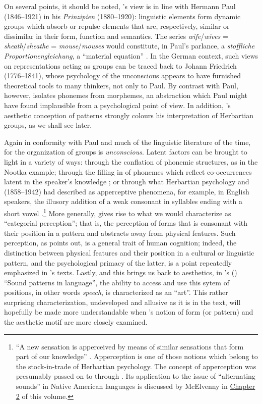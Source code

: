\documentclass[output=paper]{langscibook}
\begin{document}
On several points, it should be noted, {\Sapir}'s view is in line with Hermann Paul (1846--1921) in his \emph{Prinzipien} (1880--1920): linguistic elements form dynamic groups which absorb or repulse elements that are, respectively, similar or dissimilar in their form, function and semantics. The series \emph{wife}/\emph{wives} = \emph{sheath}/\emph{sheathe} = \emph{mouse}/\emph{mouses} would constitute, in Paul's parlance, a \emph{stoffliche Proportionengleichung}, a ``material equation'' \citep[86]{Paul1880}. In the German context, such views on representations acting as groups can be traced back to Johann Friedrich {\Herbart} (1776--1841), whose psychology of the unconscious appears to have furnished theoretical tools to many thinkers, not only to Paul. By contrast with Paul, however, {\Sapir} isolates phonemes from morphemes, an abstraction which Paul might have found implausible from a psychological point of view. In addition, {\Sapir}'s aesthetic conception of patterns strongly colours his interpretation of Herbartian groups, as we shall see later.

Again in conformity with Paul and much of the linguistic literature of the time, for {\Sapir} the organization of groups is \emph{unconscious}. Latent factors can be brought to light in a variety of ways: through the conflation of phonemic structures, as in the Nootka example; through the filling in of phonemes which reflect co-occurrences latent in the speaker’s knowledge \citep[52--53]{Sapir1933}; or through what Herbartian psychology and {\Boas} (1858--1942) had described as apperceptive phenomena, for example, in English speakers, the illusory addition of a weak consonant in syllables ending with a short vowel \citep[58--59]{Sapir1933}.\footnote{``A new sensation is apperceived by means of similar sensations that form part of our knowledge'' \citep[50]{Boas1889}. Apperception is one of those notions which belong to the stock-in-trade of Herbartian psychology. The concept of apperception was presumably passed on to {\Boas} through {\Steinthal}. Its application to the issue of ``alternating sounds'' in Native American languages is discussed by McElvenny in \hyperref[chap:mcelvenny]{Chapter 2} of this volume.} More generally,  gives rise to what we would characterize as ``categorial perception''; that is, the perception of forms that is consonant with their position in a pattern and abstracts away from physical features. Such perception, as \citet[46]{Sapir1933} points out, is a general trait of human cognition; indeed, the distinction between physical features and their position in a cultural or linguistic pattern, and the psychological primacy of the latter, is a point repeatedly emphasized in {\Sapir}'s texts. Lastly, and this brings us back to aesthetics, in {\Sapir}'s (\citeyear{Sapir1925}) ``Sound patterns in language'', the ability to access and use this sytem of positions, in other words \emph{speech}, is characterized as an ``art''. This rather surprising characterization, undeveloped and allusive as it is in the text, will hopefully be made more understandable when {\Sapir}'s notion of form (or pattern) and the aesthetic motif are more closely examined.
\end{document}
